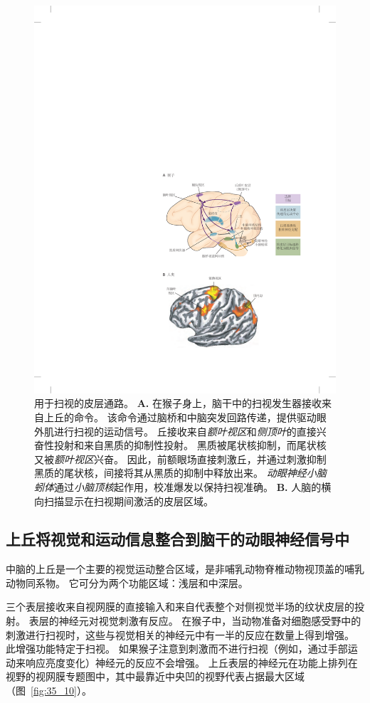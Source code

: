 \begin{figure}[htbp]
	\centering
	\includegraphics[width=0.77\linewidth]{chap35/fig_35_9}
	\caption{用于扫视的皮层通路。
		\textbf{A.} 在猴子身上，脑干中的扫视发生器接收来自上丘的命令。
		该命令通过脑桥和中脑突发回路传递，提供驱动眼外肌进行扫视的运动信号。
		丘接收来自\textit{额叶视区}和\textit{侧顶叶}的直接兴奋性投射和来自黑质的抑制性投射。
		黑质被尾状核抑制，而尾状核又被\textit{额叶视区}兴奋。
		因此，前额眼场直接刺激丘，并通过刺激抑制黑质的尾状核，间接将其从黑质的抑制中释放出来。
		\textit{动眼神经小脑蚓体}通过\textit{小脑顶核}起作用，校准爆发以保持扫视准确。
		\textbf{B.} 人脑的横向扫描显示在扫视期间激活的皮层区域\cite{curtis2008saccade}。}
	\label{fig:35_9}
\end{figure}



\subsection{上丘将视觉和运动信息整合到脑干的动眼神经信号中}

中脑的上丘是一个主要的视觉运动整合区域，是非哺乳动物脊椎动物视顶盖的哺乳动物同系物。
它可分为两个功能区域：浅层和中深层。


三个表层接收来自视网膜的直接输入和来自代表整个对侧视觉半场的纹状皮层的投射。
表层的神经元对视觉刺激有反应。
在猴子中，当动物准备对细胞感受野中的刺激进行扫视时，这些与视觉相关的神经元中有一半的反应在数量上得到增强。
此增强功能特定于扫视。
如果猴子注意到刺激而不进行扫视（例如，通过手部运动来响应亮度变化）神经元的反应不会增强。
上丘表层的神经元在功能上排列在视野的视网膜专题图中，其中最靠近中央凹的视野代表占据最大区域（图~\ref{fig:35_10}）。


